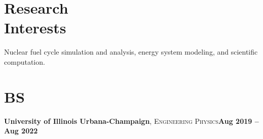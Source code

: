 \documentclass[margin,line]{resume}
\begin{document}
\begin{resume}
    \section{\mysidestyle Research\\Interests}
                Nuclear fuel cycle simulation and analysis,
                energy system modeling, and
                scientific computation.
    \section{\mysidestyle BS}
    \textbf{University of Illinois Urbana-Champaign}, \textsc{Engineering Physics}\hfill\textbf{Aug 2019 -- Aug 2022}\vspace{-3mm}\\\vspace{-1mm}%
    \vspace{-1.5mm}

\end{resume}
\end{document}
